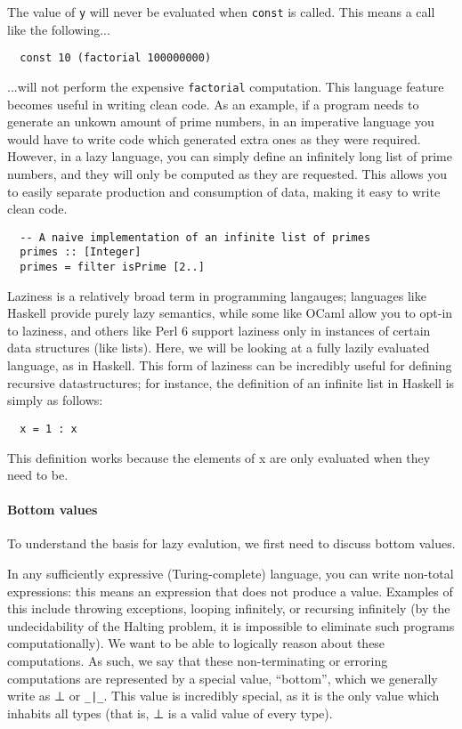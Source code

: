 \documentclass[9pt]{extarticle}
\begin{document}
The value of \verb'y' will never be evaluated when \verb'const' is
called. This means a call like the following...

\begin{verbatim}
  const 10 (factorial 100000000)
\end{verbatim}

...will not perform the expensive \verb'factorial' computation. This
language feature becomes useful in writing clean code. As an example, if
a program needs to generate an unkown amount of prime numbers, in an
imperative language you would have to write code which generated extra
ones as they were required. However, in a lazy language, you can simply
define an infinitely long list of prime numbers, and they will only be
computed as they are requested. This allows you to easily separate
production and consumption of data, making it easy to write clean code.

\begin{verbatim}
  -- A naive implementation of an infinite list of primes
  primes :: [Integer]
  primes = filter isPrime [2..]
\end{verbatim}

Laziness is a relatively broad term in programming langauges; languages like
Haskell provide purely lazy semantics, while some like OCaml allow you to opt-in
to laziness, and others like Perl 6 support laziness only in instances of
certain data structures (like lists). Here, we will be looking at a fully lazily
evaluated language, as in Haskell. This form of laziness can be incredibly
useful for defining recursive datastructures; for instance, the definition of an
infinite list in Haskell is simply as follows:

\begin{verbatim}
  x = 1 : x
\end{verbatim}

This definition works because the elements of x are only evaluated when they
need to be.

\paragraph{Bottom values}

To understand the basis for lazy evalution, we first need to discuss
bottom values.

In any sufficiently expressive (Turing-complete) language, you can write
non-total expressions: this means an expression that does not produce a
value. Examples of this include throwing exceptions, looping infinitely,
or recursing infinitely (by the undecidability of the Halting problem,
it is impossible to eliminate such programs computationally). We want to
be able to logically reason about these computations. As such, we say
that these non-terminating or erroring computations are represented by a
special value, ``bottom'', which we generally write as ⊥ or \verb'_|_'.
This value is incredibly special, as it is the only value which inhabits
all types (that is, ⊥ is a valid value of every type).
\end{document}

